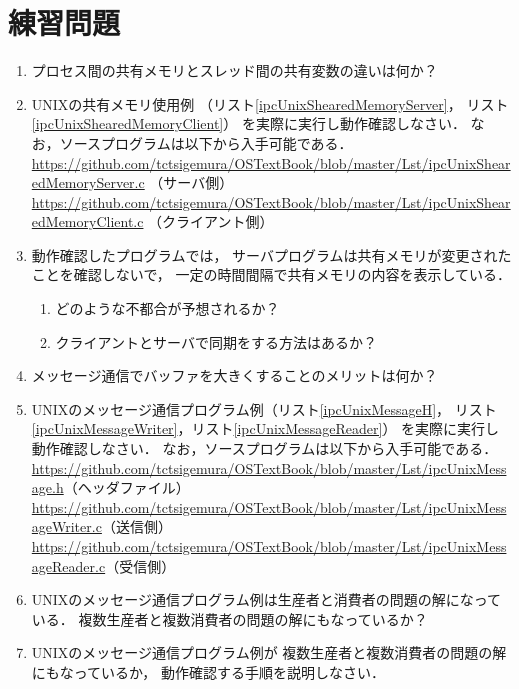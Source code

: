 \section*{練習問題}
\begin{enumerate}
  \renewcommand{\labelenumi}{\ttfamily\arabic{chapter}.\arabic{enumi}}
  \setlength{\leftskip}{1em}

\item プロセス間の共有メモリとスレッド間の共有変数の違いは何か？
\item UNIXの共有メモリ使用例
  （リスト\ref{ipcUnixShearedMemoryServer}，
    リスト\ref{ipcUnixShearedMemoryClient}）
  を実際に実行し動作確認しなさい．
  なお，ソースプログラムは以下から入手可能である． \\
  \url{https://github.com/tctsigemura/OSTextBook/blob/master/Lst/ipcUnixShearedMemoryServer.c} （サーバ側）\\
  \url{https://github.com/tctsigemura/OSTextBook/blob/master/Lst/ipcUnixShearedMemoryClient.c} （クライアント側）
\item 動作確認したプログラムでは，
  サーバプログラムは共有メモリが変更されたことを確認しないで，
  一定の時間間隔で共有メモリの内容を表示している．
  \begin{enumerate}
  \item どのような不都合が予想されるか？
  \item クライアントとサーバで同期をする方法はあるか？
  \end{enumerate}
\item メッセージ通信でバッファを大きくすることのメリットは何か？
\item UNIXのメッセージ通信プログラム例（リスト\ref{ipcUnixMessageH}，
  リスト\ref{ipcUnixMessageWriter}，リスト\ref{ipcUnixMessageReader}）
  を実際に実行し動作確認しなさい．
  なお，ソースプログラムは以下から入手可能である． \\
  \url{https://github.com/tctsigemura/OSTextBook/blob/master/Lst/ipcUnixMessage.h}（ヘッダファイル）\\
  \url{https://github.com/tctsigemura/OSTextBook/blob/master/Lst/ipcUnixMessageWriter.c}（送信側）\\
  \url{https://github.com/tctsigemura/OSTextBook/blob/master/Lst/ipcUnixMessageReader.c}（受信側）
\item UNIXのメッセージ通信プログラム例は生産者と消費者の問題の解になっている．
  複数生産者と複数消費者の問題の解にもなっているか？
\item UNIXのメッセージ通信プログラム例が
  複数生産者と複数消費者の問題の解にもなっているか，
  動作確認する手順を説明しなさい．
\end{enumerate}
